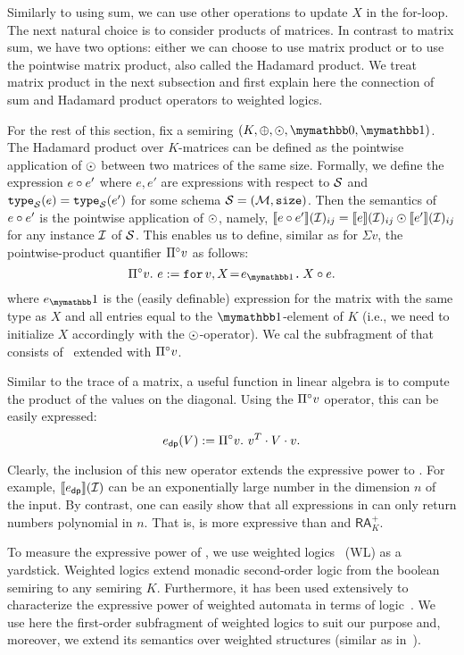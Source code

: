 Similarly to using sum, we can use other operations to update $X$ in the for-loop. The next natural choice is to consider products of matrices. In contrast to matrix sum, we have two options: either we can choose to use matrix product or to use the pointwise matrix product, also called the Hadamard product. We treat  matrix product in the next subsection and first explain here the connection of sum and Hadamard product operators to weighted logics.

For the rest of this section, fix a semiring $(K, \ksum, \kprod, \kzero, \kone)$. The Hadamard product over $K$-matrices can be defined as the pointwise application of $\odot$ between two matrices of the same size. Formally, we define the expression $e \circ e'$ where $e, e'$ are expressions with respect to $\mathcal{S}$ and $\texttt{type}_{\mathcal{S}}(e) = \texttt{type}_{\mathcal{S}}(e')$ for some schema $\mathcal{S}=(\mathcal{M},\texttt{size})$. Then the semantics of $e \circ e'$ is the pointwise application of $\odot$, namely, $\llbracket e \circ e' \rrbracket(\mathcal{I})_{ij} = \llbracket e \rrbracket(\mathcal{I})_{ij} \odot \llbracket e' \rrbracket(\mathcal{I})_{ij}$ for any instance $\mathcal{I}$ of $\mathcal{S}$. This enables us to define, similar as for  $\Sigma v$, the  pointwise-product quantifier $\Pi^{\circ} v$ as follows:
$$
\qhadprod v. \  e := \ffor{v}{X\!=\!e_{\kone}}{X \circ e}.
$$
where $e_\kone$ is the (easily definable) \langfor expression for the matrix with the same type as $X$ and all entries equal to the $\kone$-element of $K$ (i.e., we need to initialize $X$ accordingly with the $\odot$-operator).
We cal \langprod  the subfragment of \langfor that consists of \langsum \ extended with $\Pi^{\circ} v$.

\begin{example}
	Similar to the trace of a matrix, a useful function in linear algebra is to compute the product of the values on the diagonal. 
	Using the $\Pi^{\circ} v$ operator, this can be easily expressed:
	 $$
	 e_{\mathsf{dp}}(V) := \Pi^{\circ} v. \ v^T\cdot V \cdot v.$$
\end{example}

Clearly, the inclusion of this new operator extends the expressive power to \langsum. For example,  $\llbracket e_{\mathsf{dp}} \rrbracket(\mathcal{I})$ can be an exponentially large number in the dimension $n$ of the input.
By contrast, one can easily show that all expressions in \langsum can only return numbers polynomial in  $n$. That is, \langprod is more expressive than \langsum and $\mathsf{RA}_{K}^+$. 

To measure the expressive power of \langprod, we use weighted logics~\cite{DrosteG05} (WL) as a yardstick. Weighted logics extend monadic second-order logic from the boolean semiring to any semiring $K$. Furthermore, it has been used extensively to characterize the expressive power of weighted automata in terms of logic~\cite{droste2009handbook}. We use here the first-order subfragment of weighted logics to suit our purpose and, moreover, we extend its semantics over weighted structures (similar as in~\cite{GradelV17}).

